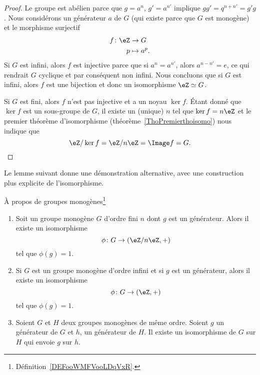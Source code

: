 \begin{proof}
    Le groupe est abélien parce que $g=a^n$, \( g'=a^{n'}\) implique \( gg'=q^{n+n'}=g'g\). Nous considérons un générateur \( a\) de \( G\) (qui existe parce que $G$ est monogène) et le morphisme surjectif
    \begin{equation}
        \begin{aligned}
            f\colon \eZ&\to G \\
            p&\mapsto a^p.
        \end{aligned}
    \end{equation}
    Si \( G\) est infini, alors \( f\) est injective parce que si \( a^n=a^{n'}\), alors \( a^{n-n'}=e\), ce qui rendrait \( G\) cyclique et par conséquent non infini. Nous concluons que si \( G\) est infini, alors \( f\) est une bijection et donc un isomorphisme \( \eZ\simeq G\).

    Si \( G\) est fini, alors \( f\) n'est pas injective et a un noyau \( \ker f\). Étant donné que \( \ker f\) est un sous-groupe de \( G\), il existe un (unique) \( n\) tel que \( \ker f=n\eZ\) et le premier théorème d'isomorphisme (théorème~\ref{ThoPremierthoisomo}) nous indique que
    \begin{equation}
        \eZ/\ker f=\eZ/n\eZ=\Image f=G.
    \end{equation}

\end{proof}

Le lemme suivant donne une démonstration alternative, avec une construction plus explicite de l'isomorphisme.

\begin{lemma}   \label{LemZhxMit}

    À propos de groupes monogènes\footnote{Définition~\ref{DEFooWMFVooLDqVxR}.}

    \begin{enumerate}
        \item


    Soit un groupe monogène \( G\) d'ordre fini \( n\) dont \( g\) est un générateur. Alors il existe un isomorphisme
    \begin{equation}
        \phi\colon G\to (\eZ/n\eZ,+)
    \end{equation}
    tel que \( \phi(g)=1\).

\item

    Si \( G\) est un groupe monogène d'ordre infini et si \( g\) est un générateur, alors il existe un isomorphisme
    \begin{equation}
        \phi\colon G\to (\eZ,+)
    \end{equation}
    tel que \( \phi(g)=1\).

   \item

    Soient \( G\) et \( H\) deux groupes monogènes de même ordre. Soient \( g\) un générateur de \( G\) et \( h\), un générateur de \( H\). Il existe un isomorphisme de \( G\) sur \( H\) qui envoie \( g\) sur \( h\).
    \end{enumerate}
\end{lemma}

